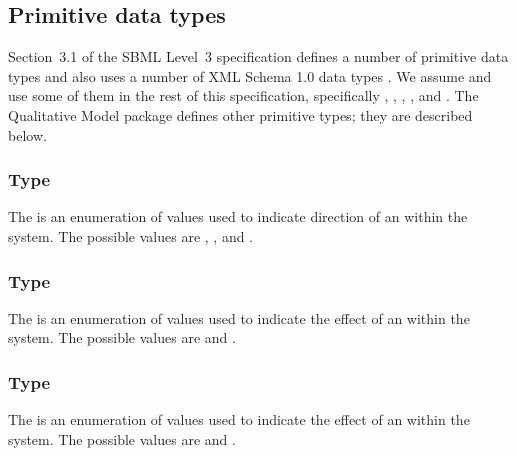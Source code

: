 \subsection{Primitive data types}
\label{primitive-types}

Section~3.1 of the SBML Level~3 specification defines a number of
primitive data types and also uses a number of XML Schema 1.0 data
types \citep{biron:2000}.  We assume and use some of them in the rest of
this specification, specifically , ,
, , and . The Qualitative Model package defines other primitive types;
they are described below.

%
%
\subsubsection{Type \fixttspace{}}
\label{primtype-sign}

The  is an enumeration of values used to indicate direction of an \Input within the system.  The possible values are , ,  and .

\subsubsection{Type \fixttspace{}}
\label{primtype-inputeffect}
The  is an enumeration of values used to indicate the effect of an \Input \Transition within the system.  The possible values are  and .

\subsubsection{Type \fixttspace{}}
\label{primtype-outputeffect}
The  is an enumeration of values used to indicate the effect of an \Output \Transition within the system.  The possible values are  and .

